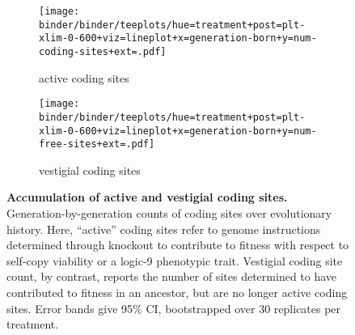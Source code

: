 \begin{figure}
    \centering
    \begin{subfigure}{\linewidth}
    \texttt{[image: binder/binder/teeplots/hue=treatment+post=plt-xlim-0-600+viz=lineplot+x=generation-born+y=num-coding-sites+ext=.pdf]}
    \caption{\footnotesize active coding sites}
    \label{fig:num-coding-sites:coding}
    \end{subfigure}

    \begin{subfigure}{\linewidth}
\texttt{[image: binder/binder/teeplots/hue=treatment+post=plt-xlim-0-600+viz=lineplot+x=generation-born+y=num-free-sites+ext=.pdf]}
    \caption{\footnotesize vestigial coding sites}
    \label{fig:num-coding-sites:coded}
    \end{subfigure}
    \caption{
        \textbf{Accumulation of active and vestigial coding sites.}
        \footnotesize
        Generation-by-generation counts of coding sites over evolutionary history.
        Here, ``active'' coding sites refer to genome instructions determined through knockout to contribute to fitness with respect to self-copy viability or a logic-9 phenotypic trait.
        Vestigial coding site count, by contrast, reports the number of sites determined to have contributed to fitness in an ancestor, but are no longer active coding sites.
        Error bands give 95\% CI, bootstrapped over 30 replicates per treatment.
    }
    \label{fig:num-coding-sites}
\end{figure}

